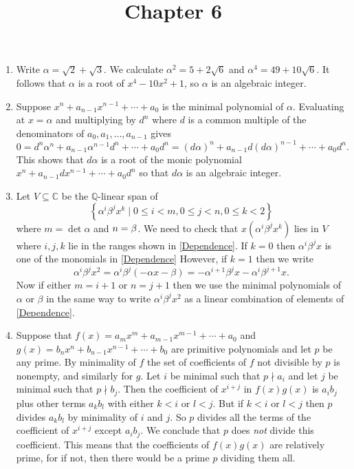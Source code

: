 \documentclass[12pt]{article}
\title{Chapter 6}
\author{}\date{}
\let\deg\relax\DeclareMathOperator{\deg}{\mathsf{deg}}
\begin{document}
\maketitle

\begin{enumerate}
\item %
Write $\alpha=\sqrt{2}+\sqrt{3}$.
We calculate $\alpha^2=5+2\sqrt{6}$
and $\alpha^4=49+10\sqrt{6}$.
It follows that $\alpha$ is a root of
$x^4-10x^2+1$, so $\alpha$ is an algebraic integer.

\item %
Suppose
$x^n+a_{n-1}x^{n-1}+\cdots+a_0$ is the
minimal polynomial of $\alpha$.
Evaluating at $x=\alpha$ and multiplying by $d^n$
where $d$ is a common multiple of the denominators
of $a_0,a_1,\ldots,a_{n-1}$ gives
\[0=d^n\alpha^n+a_{n-1}\alpha^{n-1}d^n+\cdots+a_0d^n
=\left(d\alpha\right)^n+a_{n-1}d\left(d\alpha\right)^{n-1}
+\cdots+a_0d^n.\]
This shows that $d\alpha$ is a root of the monic polynomial
$x^n+a_{n-1}dx^{n-1}+\cdots+a_0d^n$
so that $d\alpha$ is an algebraic integer.

\item %
Let $V\subseteq\mathbb{C}$ be the $\mathbb{Q}$-linear span of
\begin{equation}\label{Dependence}
\left\{\alpha^i\beta^j x^k\mid 0\le i<m,0\le j<n,0\le k<2\right\}
\end{equation}
where $m=\det{\alpha}$ and $n=\deg{\beta}$.
We need to check that $x\left(\alpha^i\beta^j x^k\right)$ lies in $V$
where $i,j,k$ lie in the ranges shown in \autoref{Dependence}.
If $k=0$ then $\alpha^i\beta^j x$ is one of the monomials in
\autoref{Dependence} However, if $k=1$ then we write
\[\alpha^i\beta^j x^2=\alpha^i\beta^j\left(-\alpha x-\beta\right)
=-\alpha^{i+1}\beta^jx-\alpha^i\beta^{j+1}x.\]
Now if either $m=i+1$ or $n=j+1$ then we use the minimal polynomials
of $\alpha$ or $\beta$ in the same way to write
$\alpha^i\beta^jx^2$ as a linear combination of elements of
\autoref{Dependence}.

\item %
Suppose that $f\left(x\right)=a_mx^m+a_{m-1}x^{m-1}+\cdots+a_0$
and $g\left(x\right)=b_nx^n+b_{n-1}x^{n-1}+\cdots+b_0$
are primitive polynomials and let $p$ be any prime.
By minimality of $f$ the set of coefficients of $f$ not divisible by $p$
is nonempty, and similarly for $g$.
Let $i$ be minimal such that $p\nmid a_i$ and let
$j$ be minimal such that $p\nmid b_j$.
Then the coefficient of $x^{i+j}$ in $f\left(x\right)g\left(x\right)$
is $a_ib_j$ plus other terms $a_kb_l$ with either $k<i$ or $l<j$.
But if $k<i$ or $l<j$ then $p$ divides $a_kb_l$ by minimality
of $i$ and $j$. So $p$ divides all the terms of the coefficient of $x^{i+j}$
except $a_ib_j$. We conclude that $p$ does {\em not} divide this coefficient.
This means that the coefficients of $f\left(x\right)g\left(x\right)$
are relatively prime, for if not, then there would be a prime $p$
dividing them all.


\end{enumerate}
\end{document}
